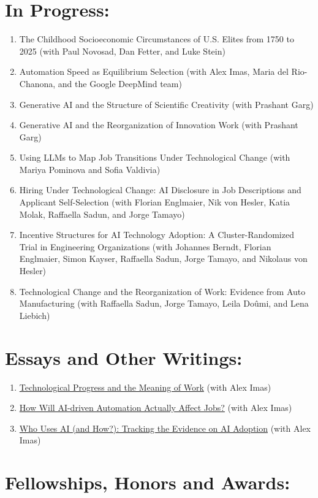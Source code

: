\documentclass[11pt,letterpaper]{article}
\newcommand{\cvsection}[1]{\Needspace{5\baselineskip}\section*{#1:}}
\begin{document}
\cvsection{In Progress}
{\setlength{\baselineskip}{12.5pt}
\begin{enumerate}[label=\arabic*.,leftmargin=28.8pt,itemsep=0pt,parsep=0pt,topsep=0pt,start=5]
\item The Childhood Socioeconomic Circumstances of U.S. Elites from 1750 to 2025 (with Paul Novosad, Dan Fetter, and Luke Stein)
\item Automation Speed as Equilibrium Selection (with Alex Imas, Maria del Rio-Chanona, and the Google DeepMind team)
\item Generative AI and the Structure of Scientific Creativity (with Prashant Garg)
\item Generative AI and the Reorganization of Innovation Work (with Prashant Garg)
\item Using LLMs to Map Job Transitions Under Technological Change (with Mariya Pominova and Sofia Valdivia)
\item Hiring Under Technological Change: AI Disclosure in Job Descriptions and Applicant Self-Selection (with Florian Englmaier, Nik von Hesler, Katia Molak, Raffaella Sadun, and Jorge Tamayo)
\item Incentive Structures for AI Technology Adoption: A Cluster-Randomized Trial in Engineering Organizations (with Johannes Berndt, Florian Englmaier, Simon Kayser, Raffaella Sadun, Jorge Tamayo, and Nikolaus von Hesler)
\item Technological Change and the Reorganization of Work: Evidence from Auto Manufacturing (with Raffaella Sadun, Jorge Tamayo, Leila Doûmi, and Lena Liebich)
\end{enumerate}}
\newpage
\cvsection{Essays and Other Writings}
\begin{enumerate}[label=\arabic*.,leftmargin=28.8pt,itemsep=2pt,parsep=0pt,topsep=0pt]
\item \href{https://aleximas.substack.com/p/technological-progress-and-the-meaning}{Technological Progress and the Meaning of Work} (with Alex Imas)
\item \href{https://aleximas.substack.com/p/how-will-ai-driven-automation-actually}{How Will AI-driven Automation Actually Affect Jobs?} (with Alex Imas)
\item \href{https://aleximas.substack.com/p/who-uses-ai-and-how}{Who Uses AI (and How?): Tracking the Evidence on AI Adoption} (with Alex Imas)
\end{enumerate}
\cvsection{Fellowships, Honors and Awards}
\end{document}

